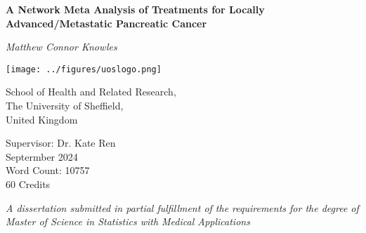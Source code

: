 \begin{titlepage}

    \begin{center}

        \vspace*{1.5cm}

        \textbf{\huge A Network Meta Analysis of Treatments for Locally Advanced/Metastatic Pancreatic Cancer } 
        
        \vspace*{1.5cm}
        
        \textit{Matthew Connor Knowles}

        \vspace*{1.5cm}
    
        \texttt{[image: ../figures/uoslogo.png]}
        
        \vspace*{1.5cm}
        
        School of Health and Related Research, \\
        The University of Sheffield, \\
        United Kingdom \\

        \vspace*{0.5cm}

        Supervisor: Dr. Kate Ren \\

        Septermber 2024 \\

        Word Count: 10757\\

        60 Credits \\
        
        \vspace*{1.5cm}

        \textit{A dissertation submitted in partial fulfillment of the requirements for the degree of Master of Science in 
        Statistics with Medical Applications}
    \end{center}
    
\end{titlepage}
